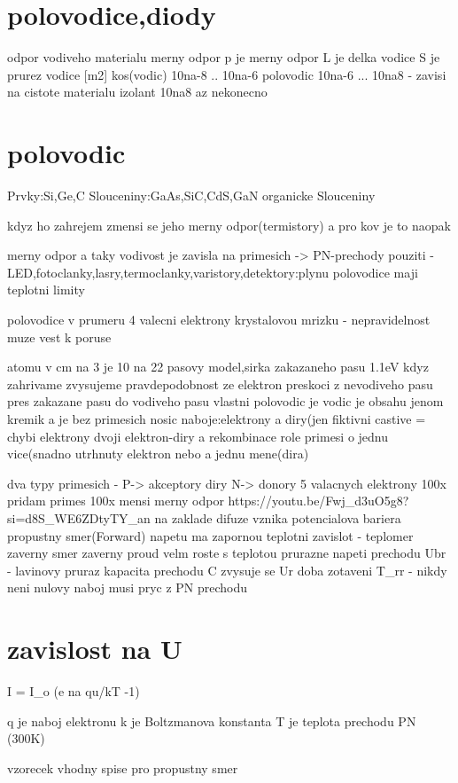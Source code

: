 \documentclass{article}
\begin{document}
\sloppy
\section{polovodice,diody}
odpor vodiveho materialu
merny odpor p je merny odpor
L je delka vodice
S je prurez vodice [m2]
kos(vodic) 10na-8 .. 10na-6
polovodic 10na-6 ... 10na8 - zavisi na cistote materialu
izolant 10na8 az nekonecno
\section{polovodic}
Prvky:Si,Ge,C
Slouceniny:GaAs,SiC,CdS,GaN
organicke Slouceniny

kdyz ho zahrejem zmensi se jeho merny odpor(termistory)
a pro kov je to naopak

merny odpor a taky vodivost je zavisla na primesich -> PN-prechody
pouziti - LED,fotoclanky,lasry,termoclanky,varistory,detektory:plynu
polovodice maji teplotni limity

polovodice v prumeru 4 valecni elektrony
krystalovou mrizku - nepravidelnost muze vest k poruse

atomu v cm na 3 je 10 na 22
pasovy model,sirka zakazaneho pasu 1.1eV
kdyz zahrivame zvysujeme pravdepodobnost ze elektron preskoci z nevodiveho pasu
pres zakazane pasu do vodiveho pasu
vlastni polovodic je vodic je obsahu jenom kremik a je bez primesich
nosic naboje:elektrony a diry(jen fiktivni castive = chybi elektrony
dvoji elektron-diry a rekombinace
role primesi o jednu vice(snadno utrhnuty elektron nebo a jednu mene(dira)

dva typy primesich - P-> akceptory diry
                     N-> donory 5 valacnych elektrony
 100x pridam primes 100x mensi merny odpor
https://youtu.be/Fwj_d3uO5g8?si=d8S_WE6ZDtyTY_an
na zaklade difuze vznika potencialova bariera
    propustny smer(Forward)
        napetu ma zapornou teplotni zavislot - teplomer
    zaverny smer
        zaverny proud velm roste s teplotou
        prurazne napeti prechodu Ubr - lavinovy pruraz
kapacita prechodu C zvysuje se Ur
doba zotaveni T_{rr} - nikdy neni nulovy naboj musi pryc z PN prechodu

\section{zavislost na U}
I = I_o (e na qu/kT -1)

q je naboj elektronu
k je Boltzmanova konstanta
T je teplota prechodu PN (300K)

vzorecek vhodny spise pro propustny smer
\end{document}
